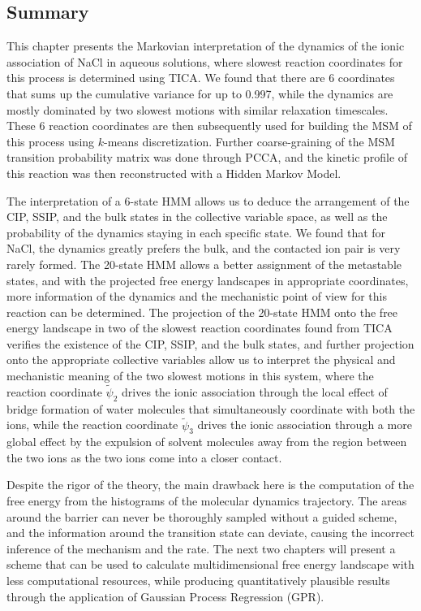 \begin{spacing}{2.0}
    \section{Summary}

    This chapter presents the Markovian interpretation of the dynamics of the ionic association of NaCl in aqueous solutions, where slowest reaction 
    coordinates for this process is determined using TICA. We found that there are 6 coordinates that sums up the cumulative variance for up to 0.997,
    while the dynamics are mostly dominated by two slowest motions with similar relaxation timescales.
    These 6 reaction coordinates are then subsequently used for building the MSM of this process using $k$-means discretization.
    Further coarse-graining of the MSM transition probability matrix was done through PCCA, and the kinetic profile of this reaction was then reconstructed
    with a Hidden Markov Model.

    The interpretation of a 6-state HMM allows us to deduce the arrangement of the CIP, SSIP, and the bulk states in the collective variable space,
    as well as the probability of the dynamics staying in each specific state. We found that for NaCl, the dynamics greatly prefers the bulk, and the 
    contacted ion pair is very rarely formed. The 20-state HMM allows a better assignment of the metastable states, and with the projected free energy
    landscapes in appropriate coordinates, more information of the dynamics and the mechanistic point of view for this reaction can be determined. 
    The projection of the 20-state HMM onto the free energy landscape in two of the slowest reaction coordinates found from TICA verifies the existence
    of the CIP, SSIP, and the bulk states, and further projection onto the appropriate collective variables allow us to interpret the physical and 
    mechanistic meaning of the two slowest motions in this system, where the reaction coordinate $\tilde{\psi}_2$ drives the ionic association through
    the local effect of bridge formation of water molecules that simultaneously coordinate with both the ions, while the reaction coordinate $\tilde{\psi}_3$
    drives the ionic association through a more global effect by the expulsion of solvent molecules away from the region between the two ions as the
    two ions come into a closer contact.

    Despite the rigor of the theory, the main drawback here is the computation of the free energy from the histograms of the molecular dynamics trajectory.
    The areas around the barrier can never be thoroughly sampled without a guided scheme, and the information around the transition state can deviate,
    causing the incorrect inference of the mechanism and the rate. The next two chapters will present a scheme that can be used to calculate multidimensional
    free energy landscape with less computational resources, while producing quantitatively plausible results through the application of Gaussian Process
    Regression (GPR).
\end{spacing}

